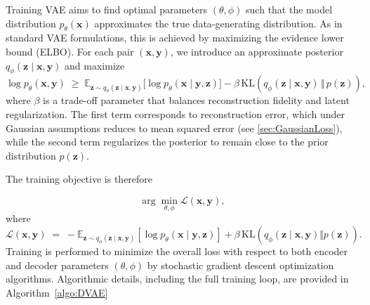 \documentclass{article}
\begin{document}
Training VAE aims to find optimal parameters $(\theta, \phi)$ such that the model distribution 
$p_\theta(\mathbf{x})$ approximates the true data-generating distribution. As in 
standard VAE formulations, this is achieved by maximizing the evidence lower 
bound (ELBO). For each  pair $(\mathbf{x}, \mathbf{y})$, we introduce an 
approximate posterior $q_\phi(\mathbf{z} \mid \mathbf{x}, \mathbf{y})$ and maximize
\begin{equation}
    \log p_\theta(\mathbf{x}, \mathbf{y}) \; \geq \; 
    \mathbb{E}_{\mathbf{z} \sim q_\phi(\mathbf{z}\mid \mathbf{x}, \mathbf{y})}
    \Big[ \log p_\theta(\mathbf{x} \mid \mathbf{y}, \mathbf{z}) \Big]
    - \beta \, \mathrm{KL}\!\left( q_\phi(\mathbf{z}\mid \mathbf{x}, \mathbf{y}) 
    \, \Vert \, p(\mathbf{z}) \right),
    \label{eq:vae-elbo}
\end{equation}
where $\beta$ is a trade-off parameter that balances reconstruction fidelity and 
latent regularization. The first term corresponds to reconstruction error, 
which under Gaussian assumptions reduces to mean squared error (see \autoref{sec:GaussianLoss}), while the second term regularizes the posterior to remain close to the prior distribution $p(\mathbf{z})$.



The training objective is therefore

\begin{equation}
\arg\min_{\theta, \phi} \mathcal{L}(\mathbf{x}, \mathbf{y}),
\end{equation}
where 
\begin{equation}\label{eq:Lxy}
    \mathcal{L}(\mathbf{x}, \mathbf{y}) \;=\; 
    - \mathbb{E}_{\mathbf{z} \sim q_\phi(\mathbf{z}\mid \mathbf{x}, \mathbf{y})} 
    \left[ \log p_\theta(\mathbf{x} \mid \mathbf{y}, \mathbf{z}) \right] 
    + \beta \, \mathrm{KL}\!\left(q_\phi(\mathbf{z}\mid \mathbf{x}, \mathbf{y}) 
    \Vert p(\mathbf{z}) \right).
\end{equation}
Training is performed to minimize the overall loss with respect to both encoder and decoder parameters $(\theta, \phi)$  by stochastic gradient descent optimization algorithms. 
Algorithmic details, including the full training loop, are provided in  Algorithm~\ref{algo:DVAE}
\end{document}
